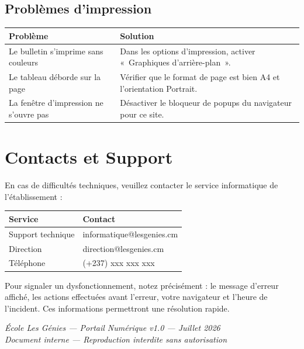 \documentclass[12pt,a4paper]{report}
\begin{document}
\section{Problèmes d'impression}

\begin{tabularx}{\textwidth}{lX}
\toprule
\textbf{Problème} & \textbf{Solution} \\
\midrule
Le bulletin s'imprime sans couleurs & Dans les options d'impression, activer «~Graphiques d'arrière-plan~». \\
\addlinespace
Le tableau déborde sur la page & Vérifier que le format de page est bien A4 et l'orientation Portrait. \\
\addlinespace
La fenêtre d'impression ne s'ouvre pas & Désactiver le bloqueur de popups du navigateur pour ce site. \\
\bottomrule
\end{tabularx}

\chapter{Contacts et Support}

En cas de difficultés techniques, veuillez contacter le service informatique de l'établissement :

\begin{center}
\begin{tabular}{ll}
\toprule
\textbf{Service} & \textbf{Contact} \\
\midrule
Support technique & informatique@lesgenies.cm \\
Direction        & direction@lesgenies.cm \\
Téléphone        & (+237) xxx xxx xxx \\
\bottomrule
\end{tabular}
\end{center}

\vspace{1cm}

\begin{infobox}
Pour signaler un dysfonctionnement, notez précisément : le message d'erreur affiché, les actions effectuées avant l'erreur, votre navigateur et l'heure de l'incident. Ces informations permettront une résolution rapide.
\end{infobox}

\vfill
\begin{center}
  \color{gray}\small
  \textit{École Les Génies — Portail Numérique v1.0 — Juillet 2026} \\
  \textit{Document interne — Reproduction interdite sans autorisation}
\end{center}
\end{document}
